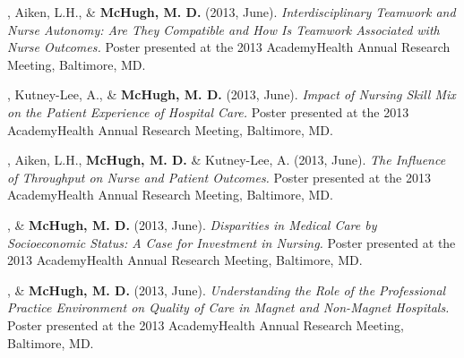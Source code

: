 \documentclass[10pt,]{article}
\begin{document}
{{{{{{{{{{{{{{{\begin{hangparas}{.25in}{1}
\end{hangparas}



\begin{hangparas}{.25in}{1}

, Aiken, L.H., \& {\textbf {McHugh, M. D.}} (2013, June). {\textit {Interdisciplinary Teamwork and Nurse Autonomy: Are They Compatible and How Is Teamwork Associated with Nurse Outcomes.}} Poster presented at the 2013 AcademyHealth Annual Research Meeting, Baltimore, MD.

\end{hangparas}



\begin{hangparas}{.25in}{1}

, Kutney-Lee, A., \& {\textbf {McHugh, M. D.}} (2013, June). {\textit {Impact of Nursing Skill Mix on the Patient Experience of Hospital Care.}} Poster presented at the 2013 AcademyHealth Annual Research Meeting, Baltimore, MD.

\end{hangparas}



\begin{hangparas}{.25in}{1}

, Aiken, L.H., {\textbf {McHugh, M. D.}} \& Kutney-Lee, A. (2013, June). {\textit {The Influence of Throughput on Nurse and Patient Outcomes.}} Poster presented at the 2013 AcademyHealth Annual Research Meeting, Baltimore, MD.

\end{hangparas}



\begin{hangparas}{.25in}{1}

, \& {\textbf {McHugh, M. D.}} (2013, June). {\textit {Disparities in Medical Care by Socioeconomic Status: A Case for Investment in Nursing.}} Poster presented at the 2013 AcademyHealth Annual Research Meeting, Baltimore, MD.

\end{hangparas}



\begin{hangparas}{.25in}{1}

, \& {\textbf {McHugh, M. D.}} (2013, June). {\textit {Understanding the Role of the Professional Practice Environment on Quality of Care in Magnet and Non-Magnet Hospitals.}} Poster presented at the 2013 AcademyHealth Annual Research Meeting, Baltimore, MD.


\end{hangparas}}}}}}}}}}}}}}}}
\end{document}
